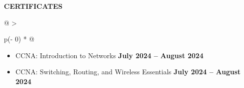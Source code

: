 \documentclass[a4paper]{article}
\begin{document}
\textbf{CERTIFICATES}
\vspace{-8pt}
\begin{longtable}[]{@{}
    >{\raggedright\arraybackslash}p{(\columnwidth - 0\tabcolsep) * }@{}}
\toprule\noalign{}
\vspace{-7pt}
\begin{minipage}[t]{\linewidth}\raggedright
    \begin{itemize}
        \item
            CCNA: Introduction to Networks
            \hspace{28.2em}\textbf{July 2024 -- August 2024}
        \item
            CCNA: Switching, Routing, and Wireless Essentials
            \hspace{21.6em}\textbf{July 2024 -- August 2024}
        \end{itemize}
\end{minipage} \\
\end{longtable}
\end{document}
